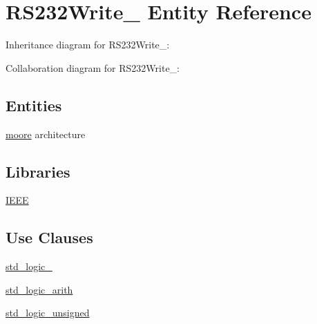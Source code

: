 \hypertarget{class_r_s232_write__16}{}\section{R\+S232\+Write\+\_ Entity Reference}
\label{class_r_s232_write__16}


Inheritance diagram for R\+S232\+Write\+\_\+:


Collaboration diagram for R\+S232\+Write\+\_\+:
\subsection*{Entities}
\begin{DoxyCompactItemize}
\item 
\hyperlink{class_r_s232_write__16_1_1moore}{moore} architecture
\end{DoxyCompactItemize}
\subsection*{Libraries}
 \begin{DoxyCompactItemize}
\item 
\hyperlink{class_r_s232_write__16_ae4f03c286607f3181e16b9aa12d0c6d4}{I\+E\+E\+E} 
\end{DoxyCompactItemize}
\subsection*{Use Clauses}
 \begin{DoxyCompactItemize}
\item 
\hyperlink{class_r_s232_write__16_acd03516902501cd1c7296a98e22c6fcb}{std\+\_\+logic\+\_}   
\item 
\hyperlink{class_r_s232_write__16_a0f5ecc6613f63d07f7963a97b1b26095}{std\+\_\+logic\+\_\+arith}   
\item 
\hyperlink{class_r_s232_write__16_a598da929e807d58939b47499e8bc9fa8}{std\+\_\+logic\+\_\+unsigned}   
\end{DoxyCompactItemize}
